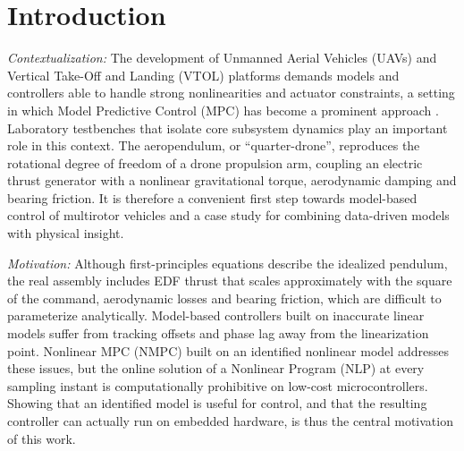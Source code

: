 \documentclass{ifacconf}
\newif\ifinstr \instrfalse
\newcommand{\instr}[1]{%
  \ifinstr
    \par\noindent
    \fcolorbox{orange!80!black}{yellow!20}{%
      \parbox{\dimexpr\linewidth-2\fboxsep-2\fboxrule}{%
        \small\sffamily\color{orange!40!black}%
        \textbf{Instrução:} #1}}%
    \par\medskip
  \fi}
\newcommand{\tamanho}[1]{%
  \ifinstr
    \par\noindent
    \fcolorbox{blue!80!black}{gray!20}{%
      \parbox{\dimexpr\linewidth-2\fboxsep-2\fboxrule}{%
        \small\sffamily\color{black!40!black}%
        \textbf{Tamanho:} #1}}%
    \par\medskip
  \fi}
\begin{document}
\section{Introduction}

\tamanho{1.5 pp. (contando resumo titulo etc)}

\textit{Contextualization: } The development of Unmanned Aerial Vehicles (UAVs) and Vertical Take-Off and Landing (VTOL) platforms demands models and controllers able to handle strong nonlinearities and actuator constraints, a setting in which Model Predictive Control (MPC) has become a prominent approach \citep{nguyen2020}. Laboratory testbenches that isolate core subsystem dynamics play an important role in this context. The aeropendulum, or ``quarter-drone'', reproduces the rotational degree of freedom of a drone propulsion arm, coupling an electric thrust generator with a nonlinear gravitational torque, aerodynamic damping and bearing friction. It is therefore a convenient first step towards model-based control of multirotor vehicles and a case study for combining data-driven models with physical insight.

\instr{Contextualização: estudo de caso para modelagem híbrida (black-box + física); 1o passo para controle de drones. }

\textit{Motivation: } Although first-principles equations describe the idealized pendulum, the real assembly includes EDF thrust that scales approximately with the square of the command, aerodynamic losses and bearing friction, which are difficult to parameterize analytically. Model-based controllers built on inaccurate linear models suffer from tracking offsets and phase lag away from the linearization point. Nonlinear MPC (NMPC) built on an identified nonlinear model addresses these issues, but the online solution of a Nonlinear Program (NLP) at every sampling instant is computationally prohibitive on low-cost microcontrollers. Showing that an identified model is useful for control, and that the resulting controller can actually run on embedded hardware, is thus the central motivation of this work.

\instr{Justificar pq é importante. }
\end{document}
